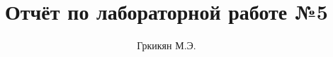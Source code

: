 \title{Отчёт по лабораторной работе №5}
\author{Гркикян М.Э.}

\usepackage[a4paper, left=20mm, top=15mm, right=15mm, bottom=15mm]{geometry}
\setmainfont{Lato}

\usepackage{caption}
\captionsetup[figure]{name=Рисунок, labelsep=endash}

\renewcommand{\contentsname}{Оглавление}


\usepackage{titlesec}
\newcommand{\sectionbreak}{\clearpage}

\usepackage{fancyhdr}
\pagestyle{fancy}
\fancyhf{}
\renewcommand{\headrulewidth}{0pt}
